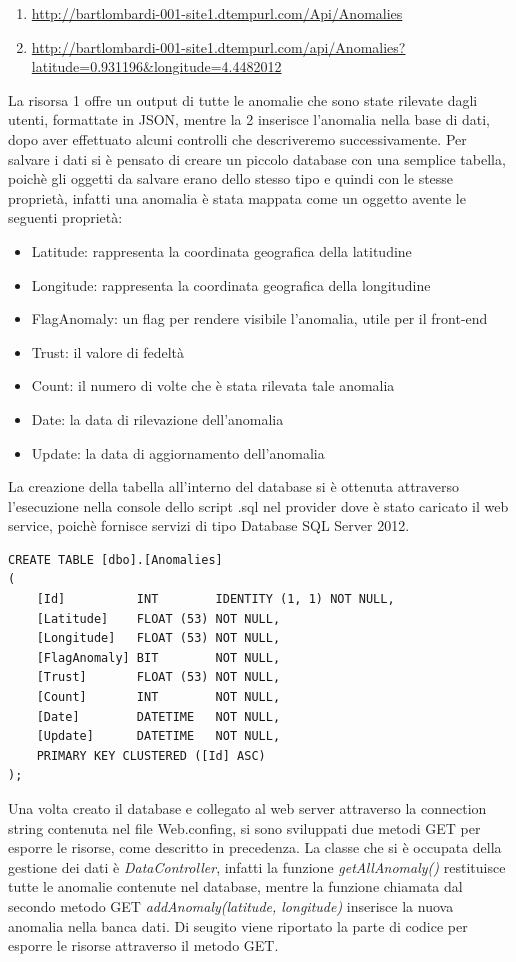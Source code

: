 \documentclass[a4paper, 11pt]{article} %
\begin{document}
\begin{enumerate}
	\item \url{http://bartlombardi-001-site1.dtempurl.com/Api/Anomalies}
	\item \url{http://bartlombardi-001-site1.dtempurl.com/api/Anomalies?latitude=0.931196\&longitude=4.4482012}
\end{enumerate}
La risorsa 1 offre un output di tutte le anomalie che sono state rilevate dagli utenti, formattate in JSON, mentre la 2 inserisce l'anomalia nella base di dati, dopo aver effettuato alcuni controlli che descriveremo successivamente. Per salvare i dati si è pensato di creare un piccolo database con una semplice tabella, poichè gli oggetti da salvare erano dello stesso tipo e quindi con le stesse proprietà, infatti una anomalia è stata mappata come un oggetto avente le seguenti proprietà:
\begin{itemize}
	\item Latitude: rappresenta la coordinata geografica della latitudine
	\item Longitude: rappresenta la coordinata geografica della longitudine
	\item FlagAnomaly: un flag per rendere visibile l'anomalia, utile per il front-end
	\item Trust: il valore di fedeltà
	\item Count: il numero di volte che è stata rilevata tale anomalia
	\item Date: la data di rilevazione dell'anomalia
	\item Update: la data di aggiornamento dell'anomalia
\end{itemize}
La creazione della tabella all'interno del database si è ottenuta attraverso l'esecuzione nella console dello script .sql nel provider dove è stato caricato il web service, poichè fornisce servizi di tipo Database SQL Server 2012.
\begin{verbatim}
CREATE TABLE [dbo].[Anomalies] 
(
    [Id]          INT        IDENTITY (1, 1) NOT NULL,
    [Latitude]    FLOAT (53) NOT NULL,
    [Longitude]   FLOAT (53) NOT NULL,
    [FlagAnomaly] BIT        NOT NULL,
    [Trust]       FLOAT (53) NOT NULL,
    [Count]       INT        NOT NULL,
    [Date]        DATETIME   NOT NULL,
    [Update]      DATETIME   NOT NULL,
    PRIMARY KEY CLUSTERED ([Id] ASC)
);
\end{verbatim}
Una volta creato il database e collegato al web server attraverso la connection string contenuta nel file Web.confing, si sono sviluppati due metodi GET per esporre le risorse, come descritto in precedenza. La classe che si è occupata della gestione dei dati è \textit{DataController}, infatti la funzione \textit{getAllAnomaly()} restituisce tutte le anomalie contenute nel database, mentre la funzione chiamata dal secondo metodo GET \textit{addAnomaly(latitude, longitude)} inserisce la nuova anomalia nella banca dati. Di seugito viene riportato la parte di codice per esporre le risorse attraverso il metodo GET.
\end{document}
